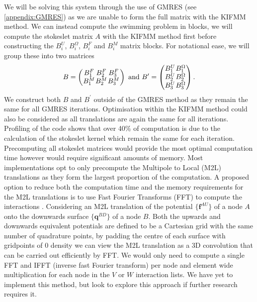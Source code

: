We will be solving this system through the use of GMRES (see \cref{appendix:GMRES}) as we are unable to form the full matrix with the KIFMM method. We can instead compute the swimming problem in blocks, we will compute the stokeslet matrix $A$ with the KIFMM method first before constructing the $B_i^U$, $B_i^\Omega$, $B_i^F$ and $B_i^M$ matrix blocks. For notational ease, we will group these into two matrices
\begin{equation*}
\arraycolsep=0.4pt\def\arraystretch{1}
B = \left( \begin{array}{ccc}
B_{1}^{F} & B_{2}^{F} & B_{3}^{F} \\
B_{1}^{M} & B_{2}^{M} & B_{3}^{M}
\end{array}\right) \text{ and }
B^\prime = \left(\begin{array}{cc}
B_{1}^{U} & B_{1}^{\Omega} \\
B_{2}^{U} & B_{2}^{\Omega} \\
B_{3}^{U} & B_{3}^{\Omega} \\
\end{array}\right).
\end{equation*} 
We construct both $B$ and $B^\prime$ outside of the GMRES method as they remain the same for all GMRES iterations. Optimisation within the KIFMM method could also be considered as all translations are again the same for all iterations. Profiling of the code shows that over 40\% of computation is due to the calculation of the stokeslet kernel which remain the same for each iteration. Precomputing all stokeslet matrices would provide the most optimal computation time however would require significant amounts of memory. Most implementations opt to only precompute the Multipole to Local (M2L) translations as they form the largest proportion of the computation. A proposed option to reduce both the computation time and the memory requirements for the M2L translations is to use Fast Fourier Transforms (FFT) to compute the interactions \cite{Ying2004}. Considering an M2L translation of the potential $\{\bm{f}^{AU}\}$ of a node $A$ onto the downwards surface $\{\bm{q}^{BD}\}$ of a node $B$. Both the upwards and downwards equivalent potentials are defined to be a Cartesian grid with the same number of quadrature points, by padding the centre of each surface with gridpoints of $0$ density we can view the M2L translation as a 3D convolution that can be carried out efficiently by FFT. We would only need to compute a single FFT and IFFT (inverse fast Fourier transform) per node and element wide multiplication for each node in the $V$ or $W$ interaction lists. We have yet to implement this method, but look to explore this approach if further research requires it.

